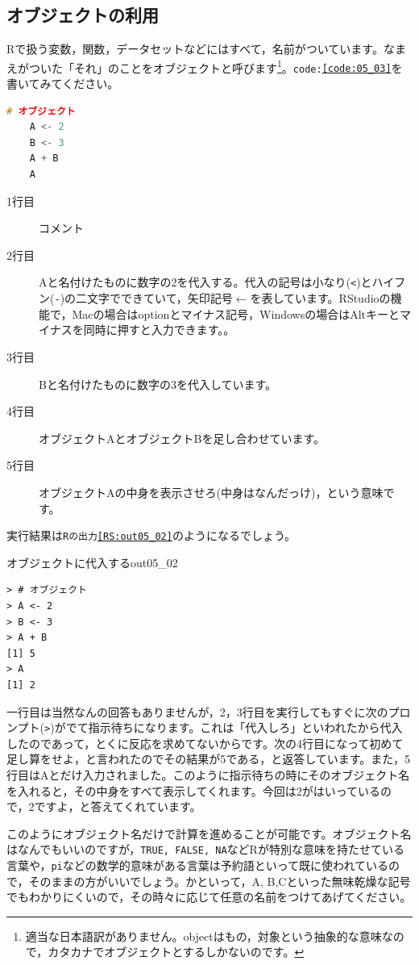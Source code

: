 \documentclass{ltjsbook}
\begin{document}
\subsection{オブジェクトの利用}
Rで扱う変数，関数，データセットなどにはすべて，名前がついています。なまえがついた「それ」のことをオブジェクトと呼びます\footnote{適当な日本語訳がありません。objectはもの，対象という抽象的な意味なので，カタカナでオブジェクトとするしかないのです。}。\texttt{code:\ref{code:05_03}}を書いてみてください。
\begin{lstlisting}[language=c++,label={code:05_03},caption={オブジェクトに代入}]
	# オブジェクト
	A <- 2
	B <- 3
	A + B
	A
\end{lstlisting}
\begin{description}
	\item[1行目] コメント
	\item[2行目] Aと名付けたものに数字の2を代入する。代入の記号は小なり(\verb|<|)とハイフン(\verb|-|)の二文字でできていて，矢印記号$\leftarrow$を表しています。RStudioの機能で，Macの場合はoptionとマイナス記号，Windowsの場合はAltキーとマイナスを同時に押すと入力できます。。
	\item[3行目] Bと名付けたものに数字の3を代入しています。
	\item[4行目] オブジェクトAとオブジェクトBを足し合わせています。
	\item[5行目] オブジェクトAの中身を表示させろ(中身はなんだっけ)，という意味です。
\end{description}

実行結果は\texttt{Rの出力\ref{RS:out05_02}}のようになるでしょう。
\begin{Rscreen}{オブジェクトに代入する}{out05_02}
	\begin{verbatim}
> # オブジェクト
> A <- 2
> B <- 3
> A + B
[1] 5
> A 
[1] 2
\end{verbatim}
\end{Rscreen}
一行目は当然なんの回答もありませんが，2，3行目を実行してもすぐに次のプロンプト(\verb|>|)がでて指示待ちになります。これは「代入しろ」といわれたから代入したのであって，とくに反応を求めてないからです。次の4行目になって初めて足し算をせよ，と言われたのでその結果が5である，と返答しています。また，5行目はAとだけ入力されました。このように指示待ちの時にそのオブジェクト名を入れると，その中身をすべて表示してくれます。今回は2がはいっているので，2ですよ，と答えてくれています。

このようにオブジェクト名だけで計算を進めることが可能です。オブジェクト名はなんでもいいのですが，\texttt{TRUE, FALSE, NA}などRが特別な意味を持たせている言葉や，\texttt{pi}などの数学的意味がある言葉は予約語といって既に使われているので，そのままの方がいいでしょう。かといって，A, B,Cといった無味乾燥な記号でもわかりにくいので，その時々に応じて任意の名前をつけてあげてください。
\end{document}
